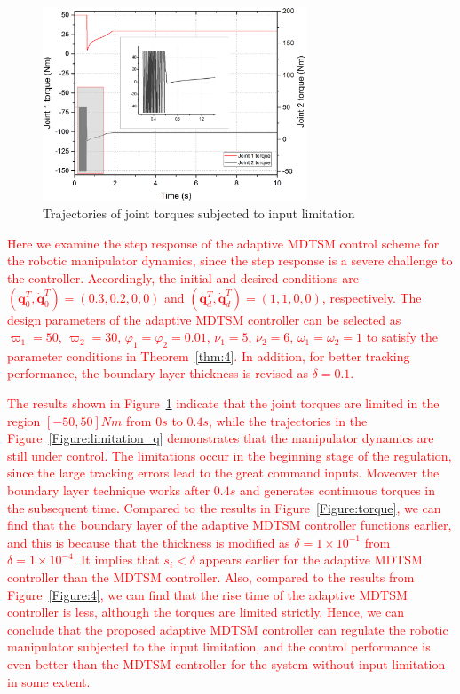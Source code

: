 \documentclass[3p]{elsarticle}
\theoremstyle{plain}
\theoremstyle{remark}
\begin{document}
\begin{figure}
\centering
\includegraphics[width=0.7\textwidth]{paper3_fig_limitation_torque.eps}
\caption{Trajectories of joint torques subjected to  input limitation}
\label{Figure:limitation_torque}
\end{figure}
\textcolor{red}{Here we examine the step response of the adaptive MDTSM control scheme for the robotic manipulator dynamics, since the step response is a severe challenge to the controller. Accordingly, the initial and desired conditions are $(\bm q_0^T, \dot{\bm q}_0^T)= (0.3,0.2,0,0)$ and $({\bm q}_d^T,\dot{\bm q}_d^T)=(1,1,0,0)$, respectively. The design parameters of the adaptive MDTSM controller can be selected as $\varpi_1=50$, $\varpi_2=30$, $\varphi_1=\varphi_2=0.01$, $\nu_1 = 5$, $\nu_2=6$, $\omega_1=\omega_2=1$ to satisfy the parameter conditions in Theorem~\ref{thm:4}. In addition, for better tracking performance, the boundary layer thickness is revised as $\delta=0.1$. }

\textcolor{red}{The results shown in Figure~\ref{Figure:limitation_torque} indicate that the joint torques are limited in the region $[-50,50]Nm$ from $0s$ to $0.4s$, while the trajectories in the Figure~\ref{Figure:limitation_q} demonstrates that the manipulator dynamics are still under control. The limitations occur in the beginning stage of the regulation, since the large tracking errors lead to the great command inputs. Moveover the boundary layer technique works after $0.4s$ and generates continuous torques in the subsequent time. Compared to the results in Figure~\ref{Figure:torque}, we can find that the boundary layer of the adaptive MDTSM controller functions earlier, and this is because that the thickness is modified as $\delta=1\times 10^{-1}$ from $\delta=1\times 10^{-4}$. It implies that $s_i<\delta$ appears earlier for the adaptive MDTSM controller than the MDTSM controller. Also, compared to the results from Figure~\ref{Figure:4}, we can find that the rise time of the adaptive MDTSM controller is less, although the torques are limited strictly. Hence, we can conclude that the proposed adaptive MDTSM controller can regulate the robotic manipulator subjected to the input limitation, and the control performance is even better than the MDTSM controller for the system without input limitation in some extent.}
\end{document}
